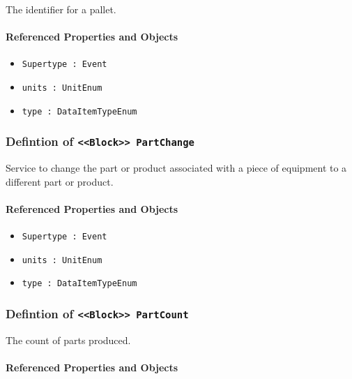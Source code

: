 \FloatBarrier

The identifier for a pallet.

\FloatBarrier
\paragraph{Referenced Properties and Objects}

\begin{itemize}
\item \texttt{Supertype : Event}

\item \texttt{units : UnitEnum}

\item \texttt{type : DataItemTypeEnum}

\end{itemize}
\FloatBarrier
\subsubsection{Defintion of \texttt{<<Block>> PartChange}}
  \label{type:PartChange}

\FloatBarrier

Service to change the part or product associated with a piece of equipment to a different part or product.

\FloatBarrier
\paragraph{Referenced Properties and Objects}

\begin{itemize}
\item \texttt{Supertype : Event}

\item \texttt{units : UnitEnum}

\item \texttt{type : DataItemTypeEnum}

\end{itemize}
\FloatBarrier
\subsubsection{Defintion of \texttt{<<Block>> PartCount}}
  \label{type:PartCount}

\FloatBarrier

The count of parts produced.

\FloatBarrier
\paragraph{Referenced Properties and Objects}

